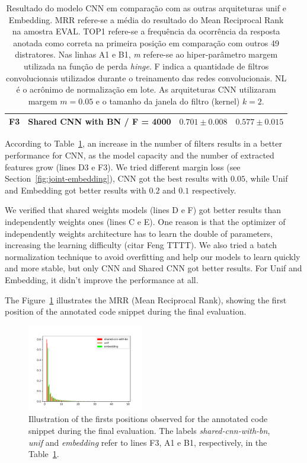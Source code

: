 \documentclass[sigconf]{acmart}
\begin{document}
\begin{table}[t]
\begin{tabular}{ p{1cm} p{6cm} >{\raggedleft\arraybackslash}p{4cm} >{\raggedleft\arraybackslash}p{4cm} }
 F3 & Shared CNN with BN / F = 4000 & $0.701 \pm 0.008$ & $0.577 \pm 0.015$\\
 
\hline
\end{tabular}
\caption{Resultado do modelo CNN em comparação com as outras arquiteturas unif e Embedding. MRR refere-se a média do resultado do Mean Reciprocal Rank na amostra EVAL. TOP1 refere-se a frequência da ocorrência da resposta anotada como correta na primeira posição em comparação com outros 49 distratores. Nas linhas A1 e B1, \emph{m} refere-se ao hiper-parâmetro margem utilizada na função de perda \emph{hinge}. F indica a quantidade de filtros convolucionais utilizados durante o treinamento das redes convolucionais. NL é o acrônimo de normalização em lote. As arquiteturas CNN utilizaram margem $m = 0.05$ e o tamanho da janela do filtro (kernel) $k = 2$.}
\label{table:resultados}
\end{table}

According to Table~\ref{table:resultados}, an increase in the number of filters results in a better performance for CNN, as the model capacity and the number of extracted features grow (lines D3 e F3). 
We tried different margin loss (see Section~\ref{fig:joint-embedding}), CNN got the best results with  $0.05$, while Unif and Embedding got better results with $0.2$ and $0.1$ respectively. 


We verified that shared weights models (lines D e F) got better results than independently weights ones (lines C e E). One reason is that the optimizer of independently weights architecture has to learn the double of parameters, increasing the learning difficulty (citar Feng TTTT). We also tried a batch normalization technique to avoid overfitting and help our models to learn quickly and more stable, but only CNN and Shared CNN got better results. For Unif and Embedding, it didn't improve the performance at all. 

The Figure~\ref{fig:histogram-mrr} illustrates the MRR (Mean Reciprocal Rank), showing the first position of the annotated code snippet during the final evaluation.

\begin{figure}[H]
    \centering
    \includegraphics[width=0.45\textwidth]{figuras/histogram.pdf}
    \caption{Illustration of the firsts positions observed for the annotated code snippet during the final evaluation. The labels \emph{shared-cnn-with-bn}, \emph{unif} and \emph{embedding} refer to lines F3, A1 e B1, respectively, in the Table~\ref{table:resultados}.}
    \label{fig:histogram-mrr}
\end{figure}
\end{document}

